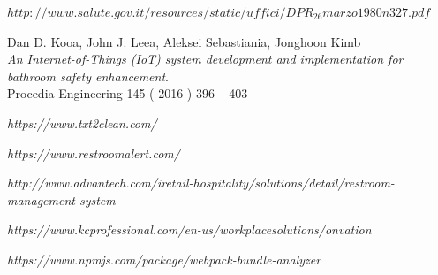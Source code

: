 \documentclass[12pt]{article}
\begin{document}

\newpage


\begin{thebibliography}{9}
\textit{$http://www.salute.gov.it/resources/static/uffici/DPR_26marzo1980n327.pdf$}

Dan D. Kooa, John J. Leea, Aleksei Sebastiania, Jonghoon Kimb \\
\textit{An Internet-of-Things (IoT) system development and
implementation for bathroom safety enhancement}.\\
Procedia Engineering 145 ( 2016 ) 396 – 403 

\textit{https://www.txt2clean.com/}

\textit{https://www.restroomalert.com/}

\textit{http://www.advantech.com/iretail-hospitality/solutions/detail/restroom-management-system}

\textit{https://www.kcprofessional.com/en-us/workplacesolutions/onvation}

\textit{https://www.npmjs.com/package/webpack-bundle-analyzer}

\end{thebibliography}

\end{document}
